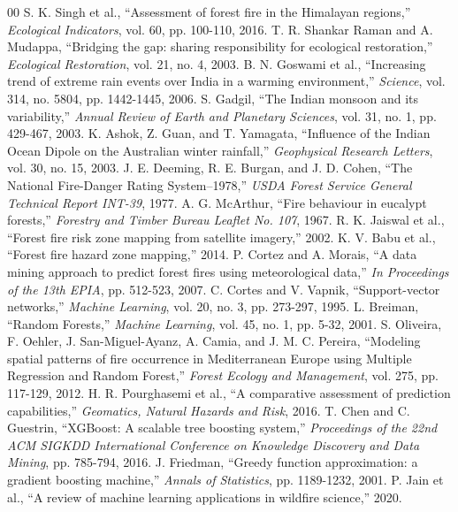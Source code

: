 \documentclass[journal, 10pt, twocolumn]{IEEEtran}
\begin{document}
\begin{thebibliography}{00}
 S. K. Singh et al., ``Assessment of forest fire in the Himalayan regions,'' \textit{Ecological Indicators}, vol. 60, pp. 100-110, 2016.
 T. R. Shankar Raman and A. Mudappa, ``Bridging the gap: sharing responsibility for ecological restoration,'' \textit{Ecological Restoration}, vol. 21, no. 4, 2003.
 B. N. Goswami et al., ``Increasing trend of extreme rain events over India in a warming environment,'' \textit{Science}, vol. 314, no. 5804, pp. 1442-1445, 2006.
 S. Gadgil, ``The Indian monsoon and its variability,'' \textit{Annual Review of Earth and Planetary Sciences}, vol. 31, no. 1, pp. 429-467, 2003.
 K. Ashok, Z. Guan, and T. Yamagata, ``Influence of the Indian Ocean Dipole on the Australian winter rainfall,'' \textit{Geophysical Research Letters}, vol. 30, no. 15, 2003.
 J. E. Deeming, R. E. Burgan, and J. D. Cohen, ``The National Fire-Danger Rating System--1978,'' \textit{USDA Forest Service General Technical Report INT-39}, 1977.
 A. G. McArthur, ``Fire behaviour in eucalypt forests,'' \textit{Forestry and Timber Bureau Leaflet No. 107}, 1967.
 R. K. Jaiswal et al., ``Forest fire risk zone mapping from satellite imagery,'' 2002.
 K. V. Babu et al., ``Forest fire hazard zone mapping,'' 2014.
 P. Cortez and A. Morais, ``A data mining approach to predict forest fires using meteorological data,'' \textit{In Proceedings of the 13th EPIA}, pp. 512-523, 2007.
 C. Cortes and V. Vapnik, ``Support-vector networks,'' \textit{Machine Learning}, vol. 20, no. 3, pp. 273-297, 1995.
 L. Breiman, ``Random Forests,'' \textit{Machine Learning}, vol. 45, no. 1, pp. 5-32, 2001.
 S. Oliveira, F. Oehler, J. San-Miguel-Ayanz, A. Camia, and J. M. C. Pereira, ``Modeling spatial patterns of fire occurrence in Mediterranean Europe using Multiple Regression and Random Forest,'' \textit{Forest Ecology and Management}, vol. 275, pp. 117-129, 2012.
 H. R. Pourghasemi et al., ``A comparative assessment of prediction capabilities,'' \textit{Geomatics, Natural Hazards and Risk}, 2016.
 T. Chen and C. Guestrin, ``XGBoost: A scalable tree boosting system,'' \textit{Proceedings of the 22nd ACM SIGKDD International Conference on Knowledge Discovery and Data Mining}, pp. 785-794, 2016.
 J. Friedman, ``Greedy function approximation: a gradient boosting machine,'' \textit{Annals of Statistics}, pp. 1189-1232, 2001.
 P. Jain et al., ``A review of machine learning applications in wildfire science,'' 2020.

\end{thebibliography}
\end{document}
